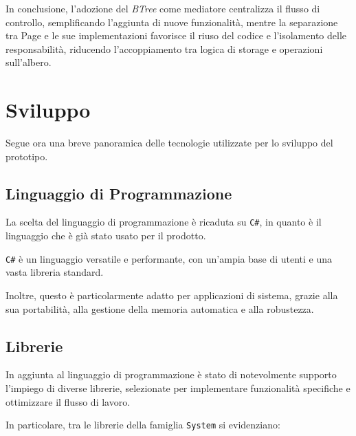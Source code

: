 \documentclass[12pt,a4paper,openright,twoside]{book}
\begin{document}
            In conclusione, l’adozione del \textit{BTree} come mediatore centralizza il flusso di controllo, semplificando l’aggiunta di nuove funzionalità, mentre la separazione tra Page e le sue implementazioni favorisce il riuso del codice e l’isolamento delle responsabilità, riducendo l’accoppiamento tra logica di storage e operazioni sull’albero.

    \section{Sviluppo}

        Segue ora una breve panoramica delle tecnologie utilizzate per lo sviluppo del prototipo.

        \subsection{Linguaggio di Programmazione}

            La scelta del linguaggio di programmazione è ricaduta su \texttt{C\#}, in quanto è il linguaggio che è già stato usato per il prodotto.

            \texttt{C\#} è un linguaggio versatile e performante, con un'ampia base di utenti e una vasta libreria standard.

            Inoltre, questo è particolarmente adatto per applicazioni di sistema, grazie alla sua portabilità, alla gestione della memoria automatica e alla robustezza.

        \subsection{Librerie}
        \label{subsec:Librerie}

            In aggiunta al linguaggio di programmazione è stato di notevolmente supporto l’impiego di diverse librerie, selezionate per implementare funzionalità specifiche e ottimizzare il flusso di lavoro.

            In particolare, tra le librerie della famiglia \texttt{System} si evidenziano:
\end{document}

